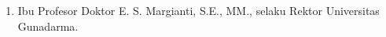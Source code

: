 \begin{enumerate}

\item Ibu Profesor Doktor E. S. Margianti, S.E., MM., selaku Rektor Universitas Gunadarma.

\end{enumerate}
